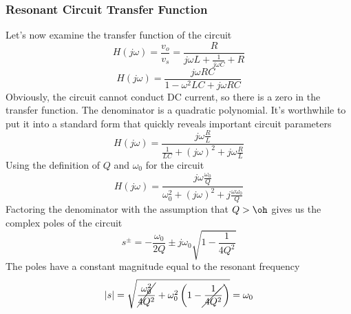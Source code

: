 \subsubsection{Resonant Circuit Transfer Function}
Let's now examine the transfer function of the circuit
\begin{equation}
    H(j\omega) = \frac{v_o}{v_s} = \frac{R}{j\omega L + \frac{1}{j\omega C} +
      R}
\end{equation}
\begin{equation}
    H(j\omega) = \frac{j\omega R C }{1 - \omega^2 LC + j\omega R C}
\end{equation}
Obviously, the circuit cannot conduct DC current, so there is a zero in the transfer function.  The denominator is a quadratic polynomial.  It's worthwhile to put it into a standard form that quickly reveals important circuit parameters
    \begin{equation}
        H(j\omega) = \frac{j\omega \frac{R}{L} }{\frac{1}{LC} + (j\omega)^2 + j\omega \frac{R}{L}}
    \end{equation}
Using the definition of $Q$ and $\omega_0$ for the circuit
    \begin{equation}
        H(j\omega) = \frac{j\omega \frac{\omega_0}{Q} }{\omega_0^2 +  (j\omega)^2 + j \frac{\omega\omega_0}{Q}}
    \end{equation}
Factoring the denominator with the assumption that $Q > \oh$ gives us the complex poles of the circuit
    \begin{equation}
        s^\pm = -\frac{\omega_0}{2 Q} \pm j\omega_0 \sqrt{1 - \frac{1}{4Q^2}}
    \end{equation}
The poles have a constant magnitude equal to the resonant frequency
    \begin{equation}
        |s| = \sqrt{\cancel{\frac{\omega_0^2}{4 Q^2}} + \omega_0^2 \left(1 - \cancel{\frac{1}{4Q^2}} \right)} = \omega_0
    \end{equation}
